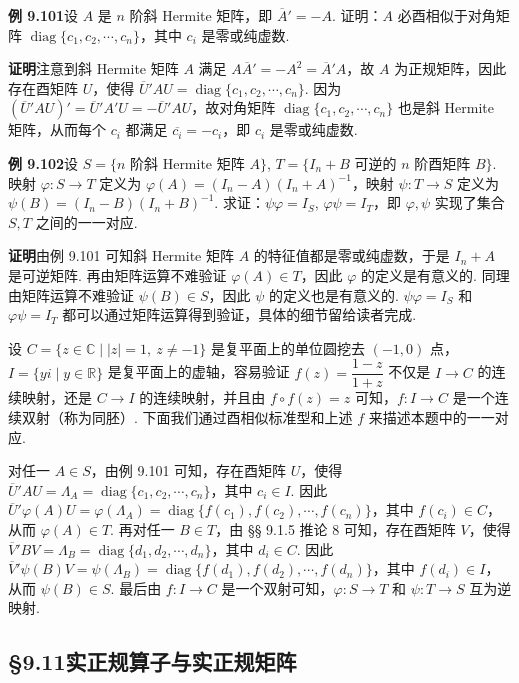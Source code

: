 \documentclass[UTF8,12pt,a4paper,fontset=fandol]{ctexart}
\begin{document}
\noindent\textbf{例 9.101}\quad 设 $A$ 是 $n$ 阶斜 Hermite 矩阵，即 $\overline{A}'=-A$. 证明：$A$ 必酉相似于对角矩阵 $\operatorname{diag}\{c_1,c_2,\cdots,c_n\}$，其中 $c_i$ 是零或纯虚数.

\noindent\textbf{证明}\quad 注意到斜 Hermite 矩阵 $A$ 满足 $A\overline{A}'=-A^2=\overline{A}'A$，故 $A$ 为正规矩阵，因此存在酉矩阵 $U$，使得 $\overline{U}'AU=\operatorname{diag}\{c_1,c_2,\cdots,c_n\}$. 因为 $(\overline{U}'AU)'=\overline{U}'A'U=-\overline{U}'AU$，故对角矩阵 $\operatorname{diag}\{c_1,c_2,\cdots,c_n\}$ 也是斜 Hermite 矩阵，从而每个 $c_i$ 都满足 $\overline{c_i}=-c_i$，即 $c_i$ 是零或纯虚数.

\noindent\textbf{例 9.102}\quad 设 $S=\{n\text{ 阶斜 Hermite 矩阵 }A\}$, $T=\{I_n+B\text{ 可逆的 }n\text{ 阶酉矩阵 }B\}$. 映射 $\varphi:S\to T$ 定义为 $\varphi(A)=(I_n-A)(I_n+A)^{-1}$，映射 $\psi:T\to S$ 定义为 $\psi(B)=(I_n-B)(I_n+B)^{-1}$. 求证：$\psi\varphi=I_S$, $\varphi\psi=I_T$，即 $\varphi,\psi$ 实现了集合 $S,T$ 之间的一一对应.

\noindent\textbf{证明}\quad 由例 9.101 可知斜 Hermite 矩阵 $A$ 的特征值都是零或纯虚数，于是 $I_n+A$ 是可逆矩阵. 再由矩阵运算不难验证 $\varphi(A)\in T$，因此 $\varphi$ 的定义是有意义的. 同理由矩阵运算不难验证 $\psi(B)\in S$，因此 $\psi$ 的定义也是有意义的. $\psi\varphi=I_S$ 和 $\varphi\psi=I_T$ 都可以通过矩阵运算得到验证，具体的细节留给读者完成.

设 $C=\{z\in\mathbb{C}\mid |z|=1,\ z\ne-1\}$ 是复平面上的单位圆挖去 $(-1,0)$ 点，$I=\{yi\mid y\in\mathbb{R}\}$ 是复平面上的虚轴，容易验证 $f(z)=\dfrac{1-z}{1+z}$ 不仅是 $I\to C$ 的连续映射，还是 $C\to I$ 的连续映射，并且由 $f\circ f(z)=z$ 可知，$f:I\to C$ 是一个连续双射（称为同胚）. 下面我们通过酉相似标准型和上述 $f$ 来描述本题中的一一对应.

对任一 $A\in S$，由例 9.101 可知，存在酉矩阵 $U$，使得 $\overline{U}'AU=\Lambda_A=\operatorname{diag}\{c_1,c_2,\cdots,c_n\}$，其中 $c_i\in I$. 因此 $\overline{U}'\varphi(A)U=\varphi(\Lambda_A)=\operatorname{diag}\{f(c_1),f(c_2),\cdots,f(c_n)\}$，其中 $f(c_i)\in C$，从而 $\varphi(A)\in T$. 再对任一 $B\in T$，由 §§ 9.1.5 推论 8 可知，存在酉矩阵 $V$，使得 $\overline{V}'BV=\Lambda_B=\operatorname{diag}\{d_1,d_2,\cdots,d_n\}$，其中 $d_i\in C$. 因此 $\overline{V}'\psi(B)V=\psi(\Lambda_B)=\operatorname{diag}\{f(d_1),f(d_2),\cdots,f(d_n)\}$，其中 $f(d_i)\in I$，从而 $\psi(B)\in S$. 最后由 $f:I\to C$ 是一个双射可知，$\varphi:S\to T$ 和 $\psi:T\to S$ 互为逆映射.

\subsection*{§9.11\quad 实正规算子与实正规矩阵}
\end{document}

